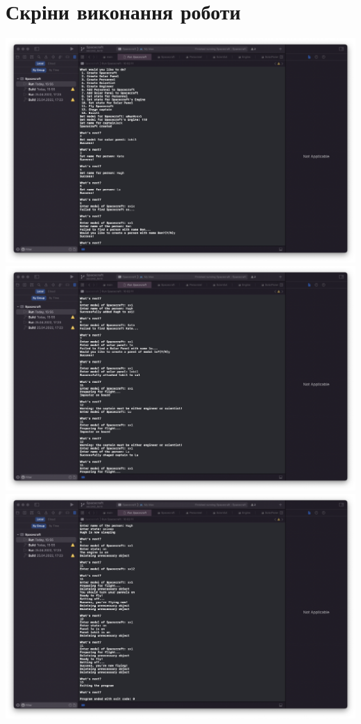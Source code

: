 \documentclass[a4paper,12pt]{article}
\begin{document}
\section{Скріни виконання роботи}
\begin{center}
	\includegraphics[width=18cm]{Screenshot1}\\
	\includegraphics[width=18cm]{Screenshot2}\\
	\includegraphics[width=18cm]{Screenshot3}
\end{center}
\end{document}
